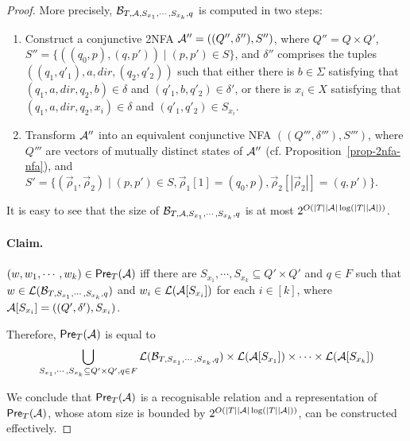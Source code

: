 \begin{proof}
More precisely, $\mathcal{B}_{T, \mathcal{A}, S_{x_1}, \cdots, S_{x_k}, q}$ is computed in two steps:
\begin{enumerate} 
\item Construct a conjunctive 2NFA $\mathcal{A}'' = ((Q'', \delta''), S'')$, where $Q'' = Q \times Q'$, $S'' = \{((q_0, p), (q, p')) \mid (p, p') \in S\}$, and $\delta''$ comprises the tuples $((q_1, q'_1), a, dir, (q_2, q'_2))$ such that either there is $b \in \Sigma$ satisfying that $(q_1, a, dir, q_2, b) \in \delta$ and $(q'_1, b, q'_2) \in \delta'$, or there is $x_i \in X$ satisfying that $(q_1, a, dir, q_2, x_i) \in \delta$  and $(q'_1, q'_2) \in S_{x_i}$.
%
\item Transform $\mathcal{A}''$ into an equivalent conjunctive NFA $((Q''',\delta'''), S''')$, where $Q'''$ are vectors of mutually distinct states of $\mathcal{A}''$ (cf. Proposition~\ref{prop-2nfa-nfa}),  and $S' = \{(\vec{\rho}_1, \vec{\rho}_2) \mid  (p, p') \in S, \vec{\rho}_1[1] =(q_0, p), \vec{\rho}_2[|\vec{\rho}_2|] = (q, p') \}$.
%
\end{enumerate} 
It is easy to see that  the size of $\mathcal{B}_{T, \mathcal{A}, S_{x_1}, \cdots, S_{x_k}, q}$ is at most 
$2^{O(|T||\mathcal{A}| \log(|T||\mathcal{A}|))}$.   



\paragraph{Claim.} %
$(w, w_1,\cdots, w_k) \in \textsf{Pre}_{T}(\mathcal{A})$ iff there are $S_{x_1}, \cdots, S_{x_k} \subseteq Q' \times Q'$ and $q \in F$ such that $w \in \mathcal{L}(\mathcal{B}_{T, S_{x_1}, \cdots, S_{x_k}, q})$ and $w_i \in \mathcal{L}(\mathcal{A}[S_{x_i}])$ for each $i \in [k]$, where $\mathcal{A}[S_{x_i}]=((Q', \delta'), S_{x_i})$.

\medskip


Therefore, $\textsf{Pre}_{T}(\mathcal{A})$ is equal to 
\[
\bigcup_{S_{x_1}, \cdots, S_{x_k} \subseteq Q' \times Q', q\in F} \mathcal{L}(\mathcal{B}_{T, S_{x_1}, \cdots, S_{x_k},q}) \times \mathcal{L}(\mathcal{A}[S_{x_1}]) \times \cdots  \times \mathcal{L}(\mathcal{A}[S_{x_k}])\]
 


We conclude that $\textsf{Pre}_{T}(\mathcal{A})$ is a recognisable relation and a representation of $\textsf{Pre}_{T}(\mathcal{A})$, whose atom size is bounded by $2^{O(|T||\mathcal{A}|\log (|T||\mathcal{A}|))}$, can be constructed effectively.
\end{proof}

